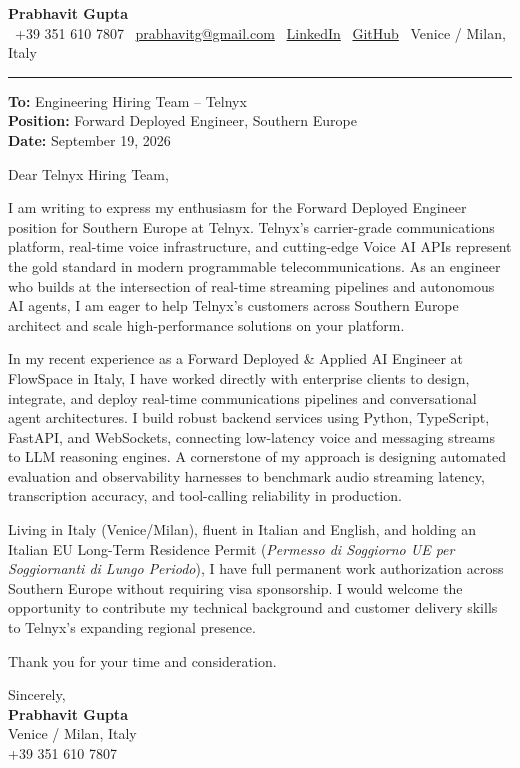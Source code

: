 \documentclass[a4paper,11pt]{article}
\begin{document}
{\huge\bfseries Prabhavit Gupta}\\[4pt]
{\small \faPhone\ +39 351 610 7807 \quad \faEnvelope\ \href{mailto:prabhavitg@gmail.com}{prabhavitg@gmail.com} \quad \faLinkedin\ \href{https://www.linkedin.com/in/prabhavit/}{LinkedIn} \quad \faGithub\ \href{https://github.com/prab-gupta}{GitHub} \quad \faMapMarker*\ Venice / Milan, Italy}

\vspace{8pt}
\rule{\textwidth}{0.6pt}
\vspace{8pt}

\textbf{To:} Engineering Hiring Team -- Telnyx\\
\textbf{Position:} Forward Deployed Engineer, Southern Europe\\
\textbf{Date:} September 19, 2026

\vspace{8pt}

Dear Telnyx Hiring Team,

I am writing to express my enthusiasm for the Forward Deployed Engineer position for Southern Europe at Telnyx. Telnyx's carrier-grade communications platform, real-time voice infrastructure, and cutting-edge Voice AI APIs represent the gold standard in modern programmable telecommunications. As an engineer who builds at the intersection of real-time streaming pipelines and autonomous AI agents, I am eager to help Telnyx's customers across Southern Europe architect and scale high-performance solutions on your platform.

In my recent experience as a Forward Deployed \& Applied AI Engineer at FlowSpace in Italy, I have worked directly with enterprise clients to design, integrate, and deploy real-time communications pipelines and conversational agent architectures. I build robust backend services using Python, TypeScript, FastAPI, and WebSockets, connecting low-latency voice and messaging streams to LLM reasoning engines. A cornerstone of my approach is designing automated evaluation and observability harnesses to benchmark audio streaming latency, transcription accuracy, and tool-calling reliability in production.

Living in Italy (Venice/Milan), fluent in Italian and English, and holding an Italian EU Long-Term Residence Permit (\textit{Permesso di Soggiorno UE per Soggiornanti di Lungo Periodo}), I have full permanent work authorization across Southern Europe without requiring visa sponsorship. I would welcome the opportunity to contribute my technical background and customer delivery skills to Telnyx's expanding regional presence.

Thank you for your time and consideration.

\vspace{12pt}
\noindent Sincerely,\\[4pt]
\textbf{Prabhavit Gupta}\\
Venice / Milan, Italy\\
+39 351 610 7807
\end{document}
